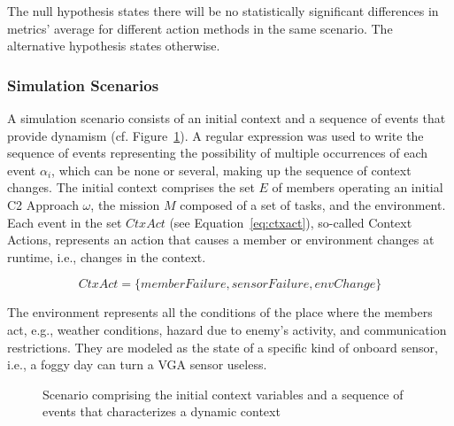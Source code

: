 

The null hypothesis states there will be no statistically significant differences in metrics' average for different action methods in the same scenario. The alternative hypothesis states otherwise. %


\subsubsection{Simulation Scenarios}
\label{sssec:scenarios}

A simulation scenario consists of an initial context and a sequence of events that provide dynamism (cf. Figure~\ref{fig:scenario}). \color{black}A regular expression was used to write the sequence of events representing the possibility of multiple occurrences of each event $\alpha_i$, which can be none or several, making up the sequence of context changes. \color{black}The initial context comprises the set $E$ of members operating an initial C2 Approach $\omega$, the mission $M$ composed of a set of tasks, and the environment. Each event in the set $CtxAct$ (see Equation~\ref{eq:ctxact})\color{black}, so-called Context Actions, \color{black}represents an action that causes a member or environment changes at runtime, i.e., changes in the context. 

\begin{equation}
    \label{eq:ctxact}
    CtxAct = \{memberFailure,sensorFailure, envChange \} 
\end{equation}

The environment represents all the conditions of the place where the members act, e.g., weather conditions, hazard due to enemy's activity, and communication restrictions. They are modeled as the state of a specific kind of onboard sensor, i.e., a foggy day can turn a VGA sensor useless.

\begin{figure}[ht!]
    \centering
    \scalebox{.5}{}
    \caption{Scenario comprising the initial context variables and a sequence of events that characterizes a dynamic context}
    \label{fig:scenario}
\end{figure}

